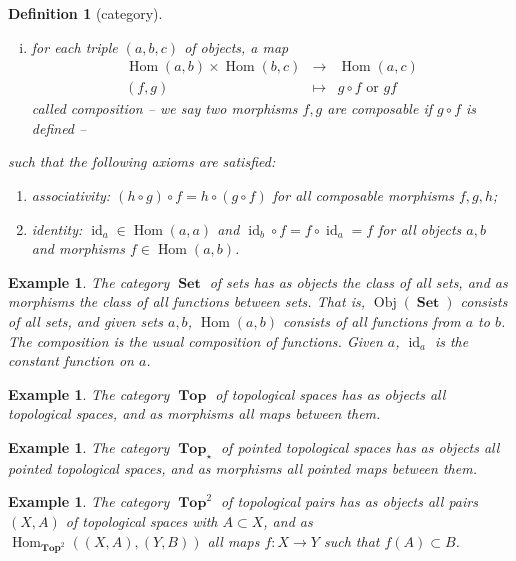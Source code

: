 \documentclass[sort&compress]{elsarticle}
\theoremstyle{theoremstyle}
\theoremstyle{framedtheoremstyle}
\theoremstyle{definitionstyle}
\newtheorem{dfn}[nul]{Definition}%
\theoremstyle{definitionstyle}
\theoremstyle{definitionstyle}
\theoremstyle{definitionstyle}
\newtheorem{exm}[nul]{Example}
\theoremstyle{nameddefinitionstyle}
\theoremstyle{framednameddefinitionstyle}
\theoremstyle{proofstyle}
\theoremstyle{definitionstyle}
\newcommand{\fromto}{\rightarrow}
\DeclareMathOperator{\identity}{id}
\newcommand{\Set}{\operatorname{\mathbf{Set}}}
\newcommand{\Top}{\operatorname{\mathbf{Top}}}
\DeclareMathOperator{\Obj}{Obj}
\DeclareMathOperator{\Hom}{Hom}
\newcommand{\paren}[1]{\left( #1 \right)}
\begin{document}
\begin{appendices}
\begin{dfn}[category]
\begin{enumerate}[(i)]
\item for each triple $(a,b,c)$ of objects, a map
\begin{eqnarray}
\Hom\paren{a,b} \times \Hom\paren{b,c} &\fromto& \Hom\paren{a,c} \nonumber \\
(f,g) &\mapsto& g \circ f \text{~or~} gf
\end{eqnarray}
called composition -- we say two morphisms $f,g$ are composable if $g \circ f$ is defined --
\end{enumerate}
such that the following axioms are satisfied:
\begin{enumerate}
\item associativity: $\paren{h\circ g} \circ f = h \circ \paren{g \circ f}$ for all composable morphisms $f, g, h$;

\item identity: $\identity_a \in \Hom\paren{a,a}$ and $\identity_b \circ f = f \circ \identity_a = f$ for all objects $a,b$ and morphisms $f\in \Hom\paren{a,b}$.
\end{enumerate}
\end{dfn}

\begin{exm}
The category $\Set$ of sets has as objects the class of all sets, and as morphisms the class of all functions between sets. That is, $\Obj(\Set)$ consists of all sets, and given sets $a,b$, $\Hom(a,b)$ consists of all functions from $a$ to $b$. The composition is the usual composition of functions. Given $a$, $\identity_a$ is the constant function on $a$.
\end{exm}

\begin{exm}
The category $\Top$ of topological spaces has as objects all topological spaces, and as morphisms all maps between them. %
\end{exm}

\begin{exm}
The category $\Top_\star$ of pointed topological spaces has as objects all pointed topological spaces, and as morphisms all pointed maps between them. %
\end{exm}

\begin{exm}
The category $\Top^2$ of topological pairs has as objects all pairs $(X,A)$ of topological spaces with $A \subset X$, and as $\Hom_{\Top^2}\paren{\paren{X,A}, \paren{Y,B}}$ all maps $f: X \fromto Y$ such that $f(A) \subset B$. %
\end{exm}


\end{appendices}
\end{document}
